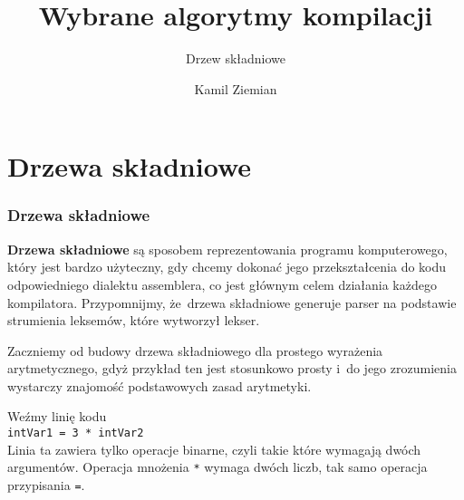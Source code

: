 \documentclass[10pt,t]{beamer}
\title{Wybrane algorytmy kompilacji}
\subtitle{Drzew składniowe}
\author{Kamil Ziemian \\
  \email}
\begin{document}





\RaggedRight





\maketitle


















\section{Drzewa składniowe}

\label{sec:Podstawy-budowy-procesora-i-jezyka-asemblera}





\begin{frame}
  \frametitle{Drzewa składniowe}


  \textbf{Drzewa składniowe} są sposobem reprezentowania programu
  komputerowego, który jest bardzo użyteczny, gdy chcemy dokonać jego
  przekształcenia do kodu odpowiedniego dialektu assemblera, co jest
  głównym celem działania każdego kompilatora. Przypomnijmy, że~drzewa
  składniowe generuje parser na podstawie strumienia leksemów, które
  wytworzył lekser.

  Zaczniemy od budowy drzewa składniowego dla prostego wyrażenia
  arytmetycznego, gdyż przykład ten jest stosunkowo prosty i~do jego
  zrozumienia wystarczy znajomość podstawowych zasad arytmetyki.

  Weźmy linię kodu \\
  \texttt{intVar1 = 3 * intVar2} \\
  Linia ta zawiera tylko operacje binarne, czyli takie które wymagają dwóch
  argumentów. Operacja mnożenia \texttt{*} wymaga dwóch liczb, tak samo
  operacja przypisania \texttt{=}.

\end{frame}
\end{document}
